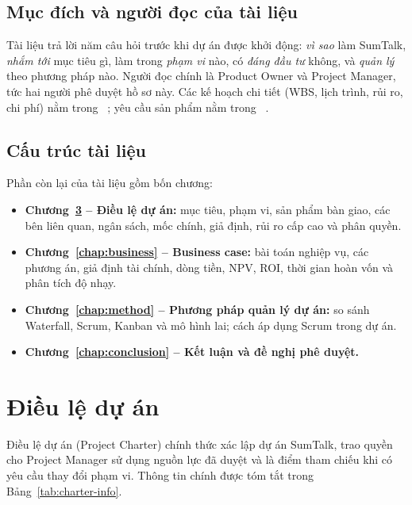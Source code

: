 \documentclass[12pt,a4paper]{report}
\begin{document}
\section{Mục đích và người đọc của tài liệu}

Tài liệu trả lời năm câu hỏi trước khi dự án được khởi động: \emph{vì sao} làm SumTalk, \emph{nhắm tới} mục
tiêu gì, làm trong \emph{phạm vi} nào, có \emph{đáng đầu tư} không, và \emph{quản lý} theo phương pháp nào.
Người đọc chính là Product Owner và Project Manager, tức hai người phê duyệt hồ sơ này. Các kế hoạch chi
tiết (WBS, lịch trình, rủi ro, chi phí) nằm trong ~\cite{pmp}; yêu cầu
sản phẩm nằm trong ~\cite{srs}.

\section{Cấu trúc tài liệu}

Phần còn lại của tài liệu gồm bốn chương:
\begin{itemize}
  \item \textbf{Chương~\ref{chap:charter} -- Điều lệ dự án:} mục tiêu, phạm vi, sản phẩm bàn giao, các bên liên
        quan, ngân sách, mốc chính, giả định, rủi ro cấp cao và phân quyền.
  \item \textbf{Chương~\ref{chap:business} -- Business case:} bài toán nghiệp vụ, các phương án, giả định tài
        chính, dòng tiền, NPV, ROI, thời gian hoàn vốn và phân tích độ nhạy.
  \item \textbf{Chương~\ref{chap:method} -- Phương pháp quản lý dự án:} so sánh Waterfall, Scrum, Kanban và mô
        hình lai; cách áp dụng Scrum trong dự án.
  \item \textbf{Chương~\ref{chap:conclusion} -- Kết luận và đề nghị phê duyệt.}
\end{itemize}

\chapter{Điều lệ dự án}
\label{chap:charter}

Điều lệ dự án (Project Charter) chính thức xác lập dự án SumTalk, trao quyền cho Project Manager sử dụng nguồn
lực đã duyệt và là điểm tham chiếu khi có yêu cầu thay đổi phạm vi. Thông tin chính được tóm tắt trong
Bảng~\ref{tab:charter-info}.
\end{document}
